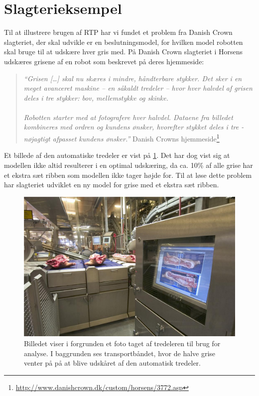 \section{Slagterieksempel}
Til at illustrere brugen af RTP har vi fundet et problem fra Danish Crown slagteriet, der skal  udvikle er en beslutningsmodel, for hvilken model robotten skal bruge til at udskære hver gris med. På Danish Crown slagteriet i Horsens udskæres grisene af en robot som beskrevet på deres hjemmeside:

\begin{quote}\textit{``Grisen [\ldots] skal nu skæres i mindre, håndterbare stykker. Det sker i en meget avanceret maskine -- en såkaldt tredeler -- hvor hver halvdel af grisen deles i tre stykker: bov, mellemstykke og skinke. \\ 
\\
Robotten starter med at fotografere hver halvdel. Dataene fra billedet kombineres med ordren og kundens ønsker, hvorefter stykket deles i tre - nøjagtigt afpasset kundens ønsker.''}{ Danish Crowns hjemmeside\footnote{\url{http://www.danishcrown.dk/custom/horsens/3772.asp}}}\end{quote}

Et billede af den automatiske tredeler er vist  på \cref{fig:pig}.  Det har dog vist sig at modellen ikke altid resulterer i en  optimal udskæring, da  ca. 10\% af alle grise har et ekstra sæt ribben som modellen ikke tager højde for. Til at løse dette problem har slagteriet udviklet en ny model for grise med et ekstra sæt ribben.

\begin{figure}
 \begin{center}
  \includegraphics[scale=0.5]{images/209690-1}
	\caption{Billedet viser i forgrunden  et foto taget af tredeleren til brug for analyse. I baggrunden ses transportbåndet, hvor de halve  grise venter på på at blive udskåret af den automatisk tredeler.}
	\label{fig:pig}
\end{center}
\end{figure}


